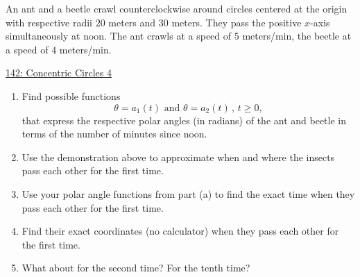 \documentclass{ximera}
\begin{document}
\begin{question} \label{Q43fg4tggfr}
An ant and a beetle crawl counterclockwise around circles centered at the origin with respective radii $20$ meters and $30$ meters.  They pass the positive $x$-axis simultaneously at noon.  The ant crawls at a speed of $5$ meters/min, the beetle at a speed of $4$ meters/min. 

\begin{onlineOnly}
    \begin{center}
\end{center}
\end{onlineOnly}

\href{https://www.desmos.com/calculator/ie75j2a9ky}{142: Concentric Circles 4}

\begin{enumerate}

\item Find possible functions
\[
   \theta = a_1(t) \text{ and } \theta = a_2(t) \, , \, t\geq 0 ,
\]
that express the respective polar angles (in radians) of the ant and beetle in terms of the number of minutes since noon.

\item Use the demonstration above to approximate when and where the insects pass each other for the first time.

\item Use your polar angle functions from part (a) to find the exact time when they pass each other for the first time.


\item Find their exact coordinates (no calculator) when they pass each other for the first time.

\item What about for the second time? For the tenth time?
\end{enumerate}
\end{question}
\end{document}
